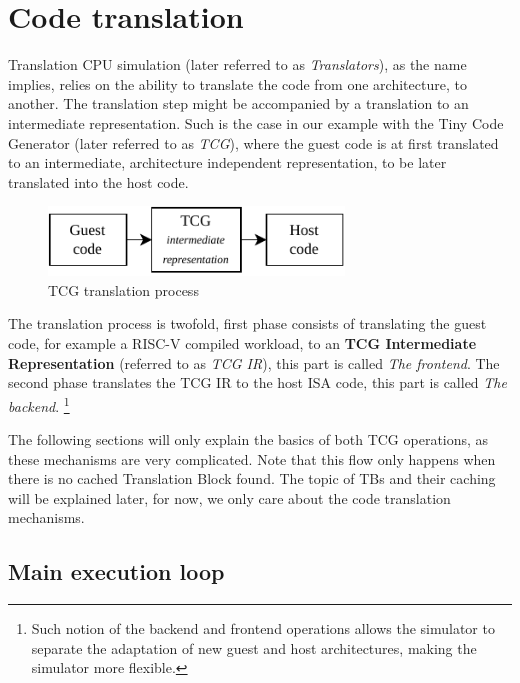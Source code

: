 \section{Code translation}

Translation CPU simulation (later referred to as \textit{Translators}), as the name implies, relies on the ability to
translate the code from one architecture, to another. The translation step might be accompanied by a translation to an
intermediate representation. Such is the case in our example with the Tiny Code Generator (later referred to as
\textit{TCG}), where the guest code is at first translated to an intermediate, architecture independent representation,
to be later translated into the host code.

\pagebreak

\begin{figure}[h]
	\centering
	\vspace{10px}
	\includegraphics[height=70px]{figures/Translation_Guest-TCG-Host.pdf}
	\caption{TCG translation process}
\end{figure}

\noindent
The translation process is twofold, first phase consists of translating the guest code, for example a RISC-V compiled
workload, to an \textbf{TCG Intermediate Representation} (referred to as \textit{TCG IR}), this part is
called \textit{The frontend}. The second phase translates the TCG IR to the host ISA code, this part is called
\textit{The backend}.%
\footnote{Such notion of the backend and frontend operations allows the simulator to separate the adaptation
of new guest and host architectures, making the simulator more flexible.}

The following sections will only explain the basics of both TCG operations, as these mechanisms are very
complicated. Note that this flow only happens when there is no cached Translation Block found. The topic of TBs and
their caching will be explained later, for now, we only care about the code translation mechanisms.

\subsection{Main execution loop}

